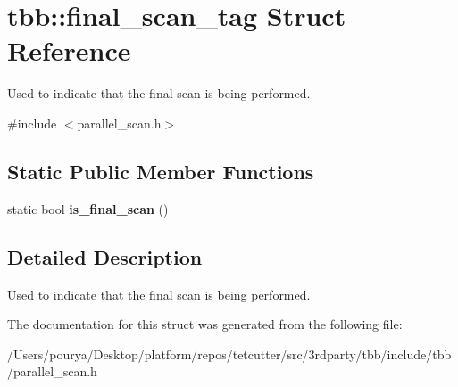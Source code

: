 \hypertarget{structtbb_1_1final__scan__tag}{}\section{tbb\+:\+:final\+\_\+scan\+\_\+tag Struct Reference}
\label{structtbb_1_1final__scan__tag}


Used to indicate that the final scan is being performed.  




{\ttfamily \#include $<$parallel\+\_\+scan.\+h$>$}

\subsection*{Static Public Member Functions}
\begin{DoxyCompactItemize}
\item 
\hypertarget{structtbb_1_1final__scan__tag_add2b3159a444aad51e3cf7ffe4d1d636}{}static bool {\bfseries is\+\_\+final\+\_\+scan} ()\label{structtbb_1_1final__scan__tag_add2b3159a444aad51e3cf7ffe4d1d636}

\end{DoxyCompactItemize}


\subsection{Detailed Description}
Used to indicate that the final scan is being performed. 



The documentation for this struct was generated from the following file\+:\begin{DoxyCompactItemize}
\item 
/\+Users/pourya/\+Desktop/platform/repos/tetcutter/src/3rdparty/tbb/include/tbb/parallel\+\_\+scan.\+h\end{DoxyCompactItemize}
